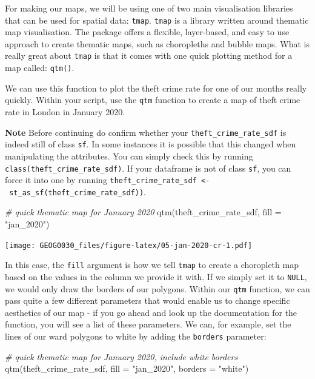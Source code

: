 \documentclass[
]{book}
\newenvironment{Shaded}{\begin{snugshade}}{\end{snugshade}}
\newcommand{\AttributeTok}[1]{\textcolor[rgb]{0.77,0.63,0.00}{#1}}
\newcommand{\CommentTok}[1]{\textcolor[rgb]{0.56,0.35,0.01}{\textit{#1}}}
\newcommand{\FunctionTok}[1]{\textcolor[rgb]{0.00,0.00,0.00}{#1}}
\newcommand{\NormalTok}[1]{#1}
\newcommand{\StringTok}[1]{\textcolor[rgb]{0.31,0.60,0.02}{#1}}
\begin{document}
For making our maps, we will be using one of two main visualisation libraries that can be used for spatial data: \texttt{tmap}. \texttt{tmap} is a library written around thematic map visualisation. The package offers a flexible, layer-based, and easy to use approach to create thematic maps, such as choropleths and bubble maps. What is really great about \texttt{tmap} is that it comes with one quick plotting method for a map called: \texttt{qtm()}.

We can use this function to plot the theft crime rate for one of our months really quickly. Within your script, use the \texttt{qtm} function to create a map of theft crime rate in London in January 2020.

\textbf{Note}
Before continuing do confirm whether your \texttt{theft\_crime\_rate\_sdf} is indeed still of class \texttt{sf}. In some instances it is possible that this changed when manipulating the attributes. You can simply check this by running \texttt{class(theft\_crime\_rate\_sdf)}. If your dataframe is not of class \texttt{sf}, you can force it into one by running \texttt{theft\_crime\_rate\_sdf\ \textless{}-\ st\_as\_sf(theft\_crime\_rate\_sdf))}.

\begin{Shaded}
\begin{Highlighting}[]
\CommentTok{\# quick thematic map for January 2020}
\FunctionTok{qtm}\NormalTok{(theft\_crime\_rate\_sdf, }\AttributeTok{fill =} \StringTok{"jan\_2020"}\NormalTok{)}
\end{Highlighting}
\end{Shaded}

\texttt{[image: GEOG0030\_files/figure-latex/05-jan-2020-cr-1.pdf]}

In this case, the \texttt{fill} argument is how we tell \texttt{tmap} to create a choropleth map based on the values in the column we provide it with. If we simply set it to \texttt{NULL}, we would only draw the borders of our polygons. Within our \texttt{qtm} function, we can pass quite a few different parameters that would enable us to change specific aesthetics of our map - if you go ahead and look up the documentation for the function, you will see a list of these parameters. We can, for example, set the lines of our ward polygons to white by adding the \texttt{borders} parameter:

\begin{Shaded}
\begin{Highlighting}[]
\CommentTok{\# quick thematic map for January 2020, include white borders}
\FunctionTok{qtm}\NormalTok{(theft\_crime\_rate\_sdf, }\AttributeTok{fill =} \StringTok{"jan\_2020"}\NormalTok{, }\AttributeTok{borders =} \StringTok{"white"}\NormalTok{)}
\end{Highlighting}
\end{Shaded}
\end{document}
